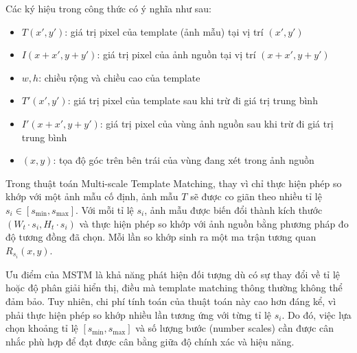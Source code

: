 \documentclass[a4paper, 12pt]{report}
\begin{document}
Các ký hiệu trong công thức có ý nghĩa như sau:
\begin{itemize}
    \item $T(x',y')$: giá trị pixel của template (ảnh mẫu) tại vị trí $(x',y')$
    \item $I(x+x', y+y')$: giá trị pixel của ảnh nguồn tại vị trí $(x+x', y+y')$
    \item $w, h$: chiều rộng và chiều cao của template
    \item $T'(x',y')$: giá trị pixel của template sau khi trừ đi giá trị trung bình
    \item $I'(x+x', y+y')$: giá trị pixel của vùng ảnh nguồn sau khi trừ đi giá trị trung bình
    \item $(x,y)$: tọa độ góc trên bên trái của vùng đang xét trong ảnh nguồn
\end{itemize}

Trong thuật toán Multi-scale Template Matching, thay vì chỉ thực hiện phép so khớp với một ảnh mẫu cố định, ảnh mẫu $T$ sẽ được co giãn theo nhiều tỉ lệ $s_i \in [s_{\min}, s_{\max}]$. Với mỗi tỉ lệ $s_i$, ảnh mẫu được biến đổi thành kích thước $(W_t \cdot s_i, H_t \cdot s_i)$ và thực hiện phép so khớp với ảnh nguồn bằng phương pháp đo độ tương đồng đã chọn. Mỗi lần so khớp sinh ra một ma trận tương quan $R_{s_i}(x, y)$.

Ưu điểm của MSTM là khả năng phát hiện đối tượng dù có sự thay đổi về tỉ lệ hoặc độ phân giải hiển thị, điều mà template matching thông thường không thể đảm bảo. Tuy nhiên, chi phí tính toán của thuật toán này cao hơn đáng kể, vì phải thực hiện phép so khớp nhiều lần tương ứng với từng tỉ lệ $s_i$. Do đó, việc lựa chọn khoảng tỉ lệ $[s_{\min}, s_{\max}]$ và số lượng bước (number scales) cần được cân nhắc phù hợp để đạt được cân bằng giữa độ chính xác và hiệu năng.
\end{document}
